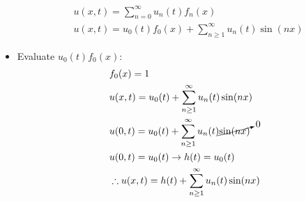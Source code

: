\documentclass[12pt, a4paper]{article}
\begin{document}
\begin{itemize}
\begin{align*}
        &u(x, t) = \sum_{n=0}^{\infty}u_n(t)f_n(x)\\
        &u(x, t) = u_0(t)f_0(x) + \sum_{n\geq 1}^{\infty}u_n(t)\sin(nx)
    \end{align*}
    \item Evaluate $u_0(t)f_0(x)$:
    \begin{align*}
        &f_0(x) = 1\\
        &u(x, t) = u_0(t) + \sum_{n\geq 1}^{\infty}u_n(t)\sin(nx) \\
        &u(0, t) = u_0(t) + \sum_{n\geq 1}^{\infty}u_n(t) \cancelto{0}{\sin(nx)} \\
        &u(0, t) = u_0(t) \rightarrow h(t) = u_0(t)\\
        &\therefore u(x, t) = h(t) + \sum_{n\geq 1}^{\infty}u_n(t)\sin(nx)
    \end{align*}
\end{itemize}
\vspace{0.3em}
\end{document}
